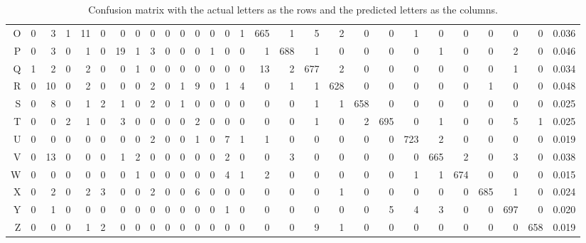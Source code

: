 \documentclass{svproc}
\begin{document}
\begin{table}[ht]
\begin{tabular}{rrrrrrrrrrrrrrrrrrrrrrrrrrrr}
  O & 0 & 3 & 1 & 11 & 0 & 0 & 0 & 0 & 0 & 0 & 0 & 0 & 0 & 1 & 665 & 1 & 5 & 2 & 0 & 0 & 1 & 0 & 0 & 0 & 0 & 0 & 0.036 \\ 
  P & 0 & 3 & 0 & 1 & 0 & 19 & 1 & 3 & 0 & 0 & 0 & 1 & 0 & 0 & 1 & 688 & 1 & 0 & 0 & 0 & 0 & 1 & 0 & 0 & 2 & 0 & 0.046 \\ 
  Q & 1 & 2 & 0 & 2 & 0 & 0 & 1 & 0 & 0 & 0 & 0 & 0 & 0 & 0 & 13 & 2 & 677 & 2 & 0 & 0 & 0 & 0 & 0 & 0 & 1 & 0 & 0.034 \\ 
  R & 0 & 10 & 0 & 2 & 0 & 0 & 0 & 2 & 0 & 1 & 9 & 0 & 1 & 4 & 0 & 1 & 1 & 628 & 0 & 0 & 0 & 0 & 0 & 1 & 0 & 0 & 0.048 \\ 
  S & 0 & 8 & 0 & 1 & 2 & 1 & 0 & 2 & 0 & 1 & 0 & 0 & 0 & 0 & 0 & 0 & 1 & 1 & 658 & 0 & 0 & 0 & 0 & 0 & 0 & 0 & 0.025 \\ 
  T & 0 & 0 & 2 & 1 & 0 & 3 & 0 & 0 & 0 & 0 & 2 & 0 & 0 & 0 & 0 & 0 & 1 & 0 & 2 & 695 & 0 & 1 & 0 & 0 & 5 & 1 & 0.025 \\ 
  U & 0 & 0 & 0 & 0 & 0 & 0 & 0 & 2 & 0 & 0 & 1 & 0 & 7 & 1 & 1 & 0 & 0 & 0 & 0 & 0 & 723 & 2 & 0 & 0 & 0 & 0 & 0.019 \\ 
  V & 0 & 13 & 0 & 0 & 0 & 1 & 2 & 0 & 0 & 0 & 0 & 0 & 2 & 0 & 0 & 3 & 0 & 0 & 0 & 0 & 0 & 665 & 2 & 0 & 3 & 0 & 0.038 \\ 
  W & 0 & 0 & 0 & 0 & 0 & 0 & 1 & 0 & 0 & 0 & 0 & 0 & 4 & 1 & 2 & 0 & 0 & 0 & 0 & 0 & 1 & 1 & 674 & 0 & 0 & 0 & 0.015 \\ 
  X & 0 & 2 & 0 & 2 & 3 & 0 & 0 & 2 & 0 & 0 & 6 & 0 & 0 & 0 & 0 & 0 & 0 & 1 & 0 & 0 & 0 & 0 & 0 & 685 & 1 & 0 & 0.024 \\ 
  Y & 0 & 1 & 0 & 0 & 0 & 0 & 0 & 0 & 0 & 0 & 0 & 0 & 1 & 0 & 0 & 0 & 0 & 0 & 0 & 5 & 4 & 3 & 0 & 0 & 697 & 0 & 0.020 \\ 
  Z & 0 & 0 & 0 & 1 & 2 & 0 & 0 & 0 & 0 & 0 & 0 & 0 & 0 & 0 & 0 & 0 & 9 & 1 & 0 & 0 & 0 & 0 & 0 & 0 & 0 & 658 & 0.019 \\ 
   \hline
\end{tabular}
\label{mod}
\caption{Confusion matrix with the actual letters as the rows and the predicted letters as the columns.} 
\end{table}
\end{document}
